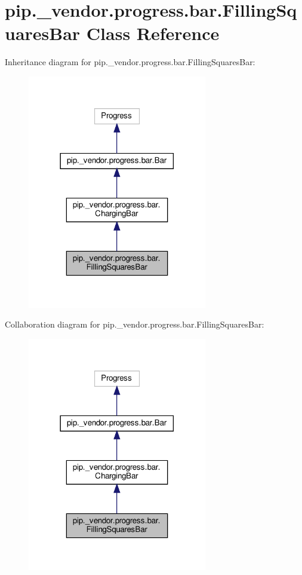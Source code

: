\hypertarget{classpip_1_1__vendor_1_1progress_1_1bar_1_1FillingSquaresBar}{}\section{pip.\+\_\+vendor.\+progress.\+bar.\+Filling\+Squares\+Bar Class Reference}
\label{classpip_1_1__vendor_1_1progress_1_1bar_1_1FillingSquaresBar}


Inheritance diagram for pip.\+\_\+vendor.\+progress.\+bar.\+Filling\+Squares\+Bar\+:
\nopagebreak
\begin{figure}[H]
\begin{center}
\leavevmode
\includegraphics[width=222pt]{classpip_1_1__vendor_1_1progress_1_1bar_1_1FillingSquaresBar__inherit__graph}
\end{center}
\end{figure}


Collaboration diagram for pip.\+\_\+vendor.\+progress.\+bar.\+Filling\+Squares\+Bar\+:
\nopagebreak
\begin{figure}[H]
\begin{center}
\leavevmode
\includegraphics[width=222pt]{classpip_1_1__vendor_1_1progress_1_1bar_1_1FillingSquaresBar__coll__graph}
\end{center}
\end{figure}
